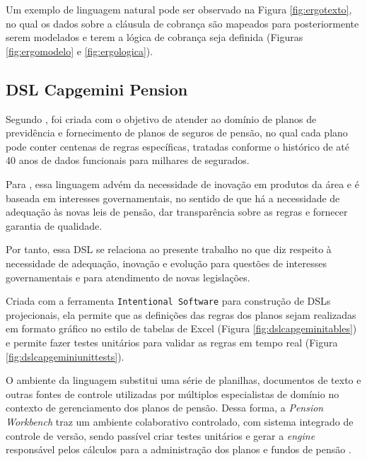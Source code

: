 Um exemplo de linguagem natural pode ser observado na Figura \ref{fig:ergotexto}, no qual os dados sobre a cláusula de cobrança são mapeados para posteriormente serem modelados e terem a lógica de cobrança seja definida (Figuras \ref{fig:ergomodelo} e \ref{fig:ergologica}). 







\newpage

\subsection{DSL Capgemini Pension}
\label{capgeminipension}

Segundo , foi criada com o objetivo de atender ao domínio de planos de previdência e fornecimento de planos de seguros de pensão, no qual cada plano pode conter centenas de regras específicas, tratadas conforme o histórico de até 40 anos de dados funcionais para milhares de segurados. 

 Para , essa linguagem advém da necessidade de inovação em produtos da área e é baseada em interesses governamentais, no sentido de que há a necessidade de adequação às novas leis de pensão, dar transparência sobre as regras e fornecer garantia de qualidade. 

Por tanto, essa DSL se relaciona ao presente trabalho no que diz respeito à necessidade de adequação, inovação e evolução para questões de interesses governamentais e para atendimento de novas legislações.

Criada com a ferramenta \texttt{Intentional Software} para construção de DSLs projecionais, ela permite que as definições das regras dos planos sejam realizadas em formato gráfico no estilo de tabelas de Excel (Figura \ref{fig:dslcapgeminitables}) e permite fazer testes unitários para validar as regras em tempo real (Figura \ref{fig:dslcapgeminiunittests}). 





O ambiente da linguagem substitui uma série de planilhas, documentos de texto e outras fontes de controle utilizadas por múltiplos especialistas de domínio no contexto de gerenciamento dos planos de pensão. Dessa forma, a \textit{Pension Workbench} traz um ambiente colaborativo controlado, com sistema integrado de controle de versão, sendo passível criar testes unitários e gerar a \textit{engine} responsável pelos cálculos para a administração dos planos e fundos de pensão \cite{gregfuller2013}.

